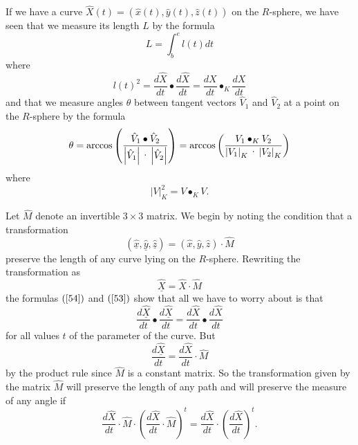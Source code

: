 \documentclass{article}%
\begin{document}
If we have a curve $\hat{X}\left(  t\right)  =\left(  \hat{x}\left(  t\right)
,\hat{y}\left(  t\right)  ,\hat{z}\left(  t\right)  \right)  $ on the
$R$-sphere, we have seen that we measure its length $L$ by the formula%
\begin{equation}
L=%
{\displaystyle\int\nolimits_{b}^{e}}
l\left(  t\right)  dt \label{54}%
\end{equation}
where
\begin{equation}
l\left(  t\right)  ^{2}=\frac{d\hat{X}}{dt}\bullet\frac{d\hat{X}}{dt}%
=\frac{dX}{dt}\bullet_{K}\frac{dX}{dt} \label{53}%
\end{equation}
and that we measure angles $\theta$ between tangent vectors $\hat{V}_{1}$ and
$\hat{V}_{2}$ at a point on the $R$-sphere by the formula%
\[
\theta=\mathrm{arccos}\left(  \frac{\hat{V}_{1}\bullet\hat{V}_{2}}{\left\vert
\hat{V}_{1}\right\vert \text{\textperiodcentered}\left\vert \hat{V}%
_{2}\right\vert }\right)  =\mathrm{arccos}\left(  \frac{V_{1}\bullet_{K}V_{2}%
}{\left\vert V_{1}\right\vert _{K}\text{\textperiodcentered}\left\vert
V_{2}\right\vert _{K}}\right)
\]
where%
\[
\left\vert V\right\vert _{K}^{2}=V\bullet_{K}V.
\]


Let $\hat{M}$ denote an invertible $3\times3$ matrix. We begin by noting the
condition that a transformation%
\[
\left(  \underline{\hat{x}},\underline{\hat{y}},\underline{\hat{z}}\right)
=\left(  \hat{x},\hat{y},\hat{z}\right)  \cdot\hat{M}%
\]
preserve the length of any curve lying on the $R$-sphere. Rewriting the
transformation as%
\begin{equation}
\underline{\hat{X}}=\hat{X}\cdot\hat{M} \label{trans1}%
\end{equation}
the formulas $\left(  \ref{54}\right)  $ and $\left(  \ref{53}\right)  $ show
that all we have to worry about is that%
\[
\frac{d\underline{\hat{X}}}{dt}\bullet\frac{d\underline{\hat{X}}}{dt}%
=\frac{d\hat{X}}{dt}\bullet\frac{d\hat{X}}{dt}%
\]
for all values $t$ of the parameter of the curve. But%
\begin{equation}
\frac{d\underline{\hat{X}}}{dt}=\frac{d\hat{X}}{dt}\cdot\hat{M} \label{trans2}%
\end{equation}
by the product rule since $\hat{M}$ is a constant matrix. So the
transformation given by the matrix $\hat{M}$ will preserve the length of any
path and will preserve the measure of any angle if%
\begin{equation}
\frac{d\hat{X}}{dt}\cdot\hat{M}\cdot\left(  \frac{d\hat{X}}{dt}\cdot\hat
{M}\right)  ^{t}=\frac{d\hat{X}}{dt}\cdot\left(  \frac{d\hat{X}}{dt}\right)
^{t}. \label{trans3}%
\end{equation}
\end{document}
